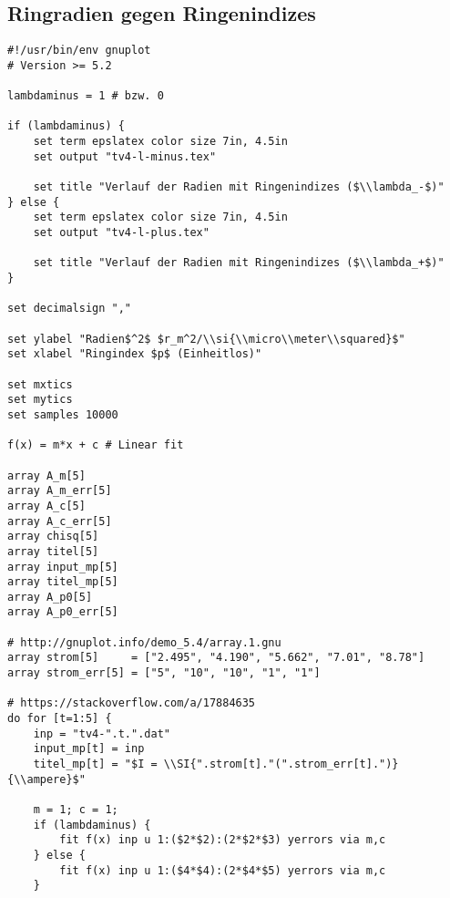 \subsection{Ringradien gegen Ringenindizes}
    \label{appdx:tv4-part1}
    {  
        \renewcommand{\fcolorbox}[4][]{#4}
        \begin{verbatim}
#!/usr/bin/env gnuplot
# Version >= 5.2

lambdaminus = 1 # bzw. 0

if (lambdaminus) {
    set term epslatex color size 7in, 4.5in
    set output "tv4-l-minus.tex"

    set title "Verlauf der Radien mit Ringenindizes ($\\lambda_-$)"
} else {
    set term epslatex color size 7in, 4.5in
    set output "tv4-l-plus.tex"

    set title "Verlauf der Radien mit Ringenindizes ($\\lambda_+$)"
}

set decimalsign ","

set ylabel "Radien$^2$ $r_m^2/\\si{\\micro\\meter\\squared}$"
set xlabel "Ringindex $p$ (Einheitlos)"

set mxtics
set mytics
set samples 10000

f(x) = m*x + c # Linear fit

array A_m[5]
array A_m_err[5]
array A_c[5]
array A_c_err[5]
array chisq[5]
array titel[5]
array input_mp[5]
array titel_mp[5]
array A_p0[5]
array A_p0_err[5]

# http://gnuplot.info/demo_5.4/array.1.gnu
array strom[5]     = ["2.495", "4.190", "5.662", "7.01", "8.78"]
array strom_err[5] = ["5", "10", "10", "1", "1"]

# https://stackoverflow.com/a/17884635
do for [t=1:5] {
    inp = "tv4-".t.".dat"
    input_mp[t] = inp
    titel_mp[t] = "$I = \\SI{".strom[t]."(".strom_err[t].")}{\\ampere}$"

    m = 1; c = 1;
    if (lambdaminus) {
        fit f(x) inp u 1:($2*$2):(2*$2*$3) yerrors via m,c
    } else {
        fit f(x) inp u 1:($4*$4):(2*$4*$5) yerrors via m,c
    }
    

\end{verbatim}}
